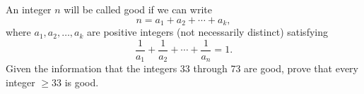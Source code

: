 An integer $n$ will be called good if we can write \[n=a_1+a_2+\cdots+a_k,\] where $a_1,a_2, \ldots, a_k$ are positive integers (not necessarily distinct) satisfying \[\frac{1}{a_1}+\frac{1}{a_2}+\cdots+\frac{1}{a_n}=1.\] Given the information that the integers 33 through 73 are good, prove that every integer $\ge 33$ is good.